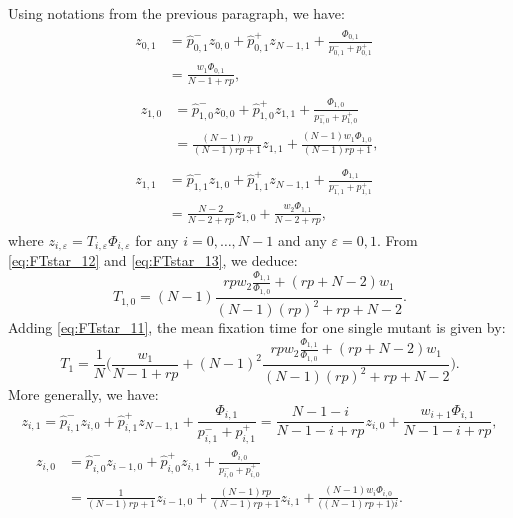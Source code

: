 \documentclass[a4paper,english,10pt]{amsart}
\theoremstyle{definition}
\numberwithin{equation}{section}
\begin{document}
Using notations from the previous paragraph, we have:  
\begin{align}  \label{eq:FTstar_11}
\begin{split}
  z_{0,1} &= \hat p_{0,1}^- z_{0,0} 
                  + \hat p_{0,1}^+ z_{N-1,1} + 
			\frac{\Phi_{0,1}}{p_{0,1}^- +p_{0,1}^+} \phantom{X}  \\
             &= \frac{w_1\Phi_{0,1}}{N-1+rp},  
\end{split}
\end{align}
\begin{align} \label{eq:FTstar_12}
\begin{split}
z_{1,0} &= \hat p_{1,0}^- z_{0,0} 
                  + \hat p_{1,0}^+ z_{1,1} +  
	\frac{\Phi_{1,0}}{p_{1,0}^- +p_{1,0}^+}  \\
  &= \frac{(N-1)rp}{(N-1)rp+1}z_{1,1} + 
\frac{(N-1)w_1\Phi_{1,0}}{(N-1)rp+1}, 
\end{split}
\end{align}
\begin{align} \label{eq:FTstar_13} 
\begin{split}
z_{1,1} &= \hat p_{1,1}^- z_{1,0} + \hat p_{1,1}^+ z_{N-1,1}+ \frac{\Phi_{1,1}}{p_{1,1}^- +p_{1,1}^+}  \phantom{X} \\
       &= \frac{N-2}{N - 2 + rp} z_{1,0} +  \frac{w_2\Phi_{1,1}}{N-2+rp}, 
\end{split}
\end{align}
where $z_{i,\varepsilon} = T_{i,\varepsilon} \Phi_{i,\varepsilon}$ for any $i = 0,\dots, N-1$ and any $\varepsilon = 0,1$. 
From \eqref{eq:FTstar_12} and \eqref{eq:FTstar_13}, we deduce:
\[
 T_{1,0} = (N-1) \frac{ rpw_2\frac{\Phi_{1,1}}{\Phi_{1,0}} + (rp+N-2)w_1}{(N-1)(rp)^2 + rp + N-2}.
\]
Adding \eqref{eq:FTstar_11}, the mean fixation time for one single mutant is given by: 
\begin{equation}
  \label{eq:FT_star}
 T_1  = \frac{1}{N} \Big( \frac{w_1}{N-1+rp} + (N-1)^2 \frac{ rpw_2\frac{\Phi_{1,1}}{\Phi_{1,0}} + (rp+N-2)w_1}{(N-1)(rp)^2 + rp + N-2} \Big). 
\end{equation}
More generally, we have: 
\begin{equation} \label{eq:FTstar_i1}  
  z_{i,1} = \hat p_{i,1}^- z_{i,0} 
                  + \hat p_{i,1}^+ z_{N-1,1} + 
			\frac{\Phi_{i,1}}{p_{i,1}^- +p_{i,1}^+} 
             = \frac{N-1-i}{N-1-i+rp}z_{i,0} + \frac{w_{i+1}\Phi_{i,1}}{N-1-i+rp}, 
\end{equation}
\begin{align} 
\begin{split}
z_{i,0} &= \hat p_{i,0}^- z_{i-1,0} 
                  + \hat p_{i,0}^+ z_{i,1} +  
	\frac{\Phi_{i,0}}{p_{i,0}^- +p_{i,0}^+}  \label{eq:FTstar_i2} \\ 
             &= \frac{1}{(N-1)rp+1} z_{i-1,0} 
                  + \frac{(N-1)rp}{(N-1)rp+1}z_{i,1} + 
\frac{(N-1)w_i\Phi_{i,0}}{\big((N-1)rp+1\big)i}. \phantom{XXXXXXX}
\end{split}
\end{align}
\end{document}
